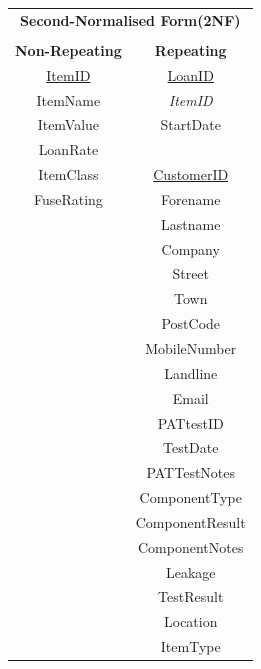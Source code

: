 \newpage

\begin{center}
    \begin{tabular}{|c|c|}
        \hline
        \multicolumn{2}{|c|}{\textbf{Second-Normalised Form(2NF)}} \\
        \multicolumn{2}{|c|}{ }                                    \\ \hline
        \textbf{Non-Repeating} & \textbf{Repeating}                \\ \hline
        \underline{ItemID}     & \underline{LoanID}                \\ 
        ItemName               & \emph{ItemID}                     \\ 
        ItemValue	          & StartDate                         \\ 
        LoanRate 	          &                                   \\
        ItemClass              & \underline{CustomerID}            \\ 
        FuseRating             & Forename                          \\ 
                               & Lastname                          \\ 
              	              & Company                           \\ 
                               & Street                            \\ 
                               & Town                              \\ 
                               & PostCode                          \\ 
                               & MobileNumber                      \\ 
                               & Landline                          \\ 
                               & Email                             \\ 
                               & PATtestID                         \\ 
                               & TestDate                          \\ 
                               & PATTestNotes                      \\ 
                               & ComponentType                     \\
                               & ComponentResult                   \\
                               & ComponentNotes                    \\
                               & Leakage                           \\ 
                               & TestResult                        \\ 
                               & Location                          \\
                               & ItemType                          \\ \hline
    \end{tabular}
\end{center}

